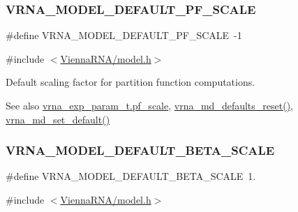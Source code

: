 \subsubsection{\texorpdfstring{V\+R\+N\+A\+\_\+\+M\+O\+D\+E\+L\+\_\+\+D\+E\+F\+A\+U\+L\+T\+\_\+\+P\+F\+\_\+\+S\+C\+A\+LE}{VRNA\_MODEL\_DEFAULT\_PF\_SCALE}}
{\footnotesize\ttfamily \#define V\+R\+N\+A\+\_\+\+M\+O\+D\+E\+L\+\_\+\+D\+E\+F\+A\+U\+L\+T\+\_\+\+P\+F\+\_\+\+S\+C\+A\+LE~-\/1}



{\ttfamily \#include $<$\hyperlink{model_8h}{Vienna\+R\+N\+A/model.\+h}$>$}



Default scaling factor for partition function computations. 

\begin{DoxySeeAlso}{See also}
\hyperlink{group__energy__parameters_a53c12f0d74f94ce371e0471a8ab5a377}{vrna\+\_\+exp\+\_\+param\+\_\+t.\+pf\+\_\+scale}, \hyperlink{group__model__details_ga70834424cf804d149937de89f80ceb45}{vrna\+\_\+md\+\_\+defaults\+\_\+reset()}, \hyperlink{group__model__details_ga8ac6ff84936282436f822644bf841f66}{vrna\+\_\+md\+\_\+set\+\_\+default()} 
\end{DoxySeeAlso}
\mbox{\label{group__model__details_ga383d3ac8d08c3b6221754b50871c1200}} 
\subsubsection{\texorpdfstring{V\+R\+N\+A\+\_\+\+M\+O\+D\+E\+L\+\_\+\+D\+E\+F\+A\+U\+L\+T\+\_\+\+B\+E\+T\+A\+\_\+\+S\+C\+A\+LE}{VRNA\_MODEL\_DEFAULT\_BETA\_SCALE}}
{\footnotesize\ttfamily \#define V\+R\+N\+A\+\_\+\+M\+O\+D\+E\+L\+\_\+\+D\+E\+F\+A\+U\+L\+T\+\_\+\+B\+E\+T\+A\+\_\+\+S\+C\+A\+LE~1.}



{\ttfamily \#include $<$\hyperlink{model_8h}{Vienna\+R\+N\+A/model.\+h}$>$}



